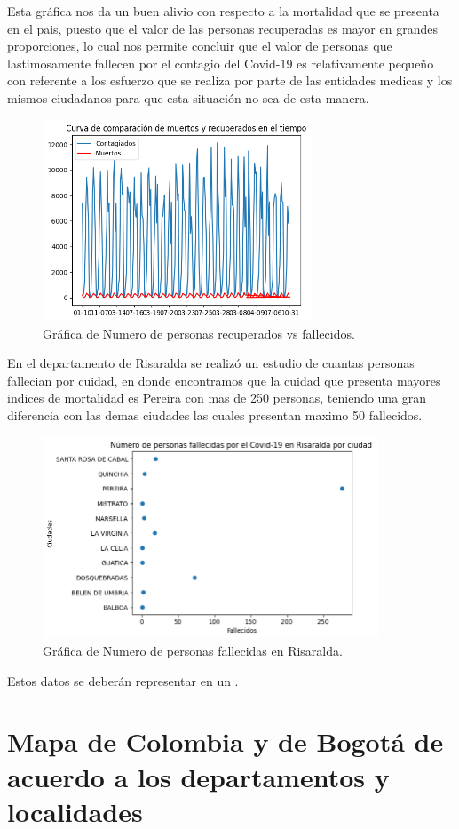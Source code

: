 \documentclass[conference,compsoc,onecolumn]{IEEEtran}
\begin{document}
Esta gráfica nos da un buen alivio con respecto a la mortalidad que se presenta en el pais, puesto que el valor de las personas recuperadas es mayor en grandes proporciones, lo cual nos permite concluir que el valor de personas que lastimosamente fallecen por el contagio del Covid-19 es relativamente pequeño con referente a los esfuerzo que se realiza por parte de las entidades medicas y los mismos ciudadanos para que esta situación no sea de esta manera.
\begin{figure}[H]
\centering
\includegraphics[width=8cm]{./Graficomuerte2.png}
\caption{Gráfica de Numero de personas recuperados vs fallecidos.}
\label{fig:mesh1}
\end{figure}

En el departamento de Risaralda se realizó un estudio de cuantas personas fallecian por cuidad, en donde encontramos que la cuidad que presenta mayores indices de mortalidad es Pereira con mas de 250 personas, teniendo una gran diferencia con las demas ciudades las cuales presentan maximo 50 fallecidos.
\begin{figure}[H]
\centering
\includegraphics[width=10cm]{./Grafico_Depto1.png}
\caption{Gráfica de Numero de personas fallecidas en Risaralda.}
\label{fig:mesh1}
\end{figure}

Estos datos se deberán representar en un .
\section{Mapa de Colombia y de Bogotá de acuerdo a los departamentos y localidades}
\end{document}
